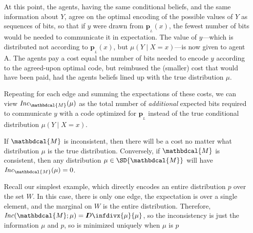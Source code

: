 \documentclass{article}
\theoremstyle{plain}
\theoremstyle{definition}
\theoremstyle{remark}
\newcommand{\thickD}{I\mkern-8muD}
\newcommand{\kldiv}{\thickD\infdivx}
\newcommand\mat[1]{\mathbf{#1}}
\newcommand{\bp}[1][L]{\mat{p}_{\!_{#1}\!}}
\newcommand{\dg}[1]{\mathbdcal{#1}}
\newcommand\Inc{\mathit{Inc}}
\numberwithin{equation}{section}
\begin{document}
\begin{vfull}
At this point, the agents, having the same conditional beliefs, and
the same information about $Y$, agree on the optimal encoding 
of the possible values of $Y$ as sequences of bits, so that if $y$
were drawn from $\bp(x)$, the fewest number of bits would be needed
to communicate it in expectation. The value of $y$---which is distributed
not according to $\bp(x)$, but $\mu(Y \mid X=x)$---is now given to agent A.
The agents pay a cost equal the number of bits needed to encode $y$ according
to the agreed-upon optimal code, but reimbused the (smaller) cost that would have been paid,
had the agents beliefs lined up with the true distribution $\mu$.

Repeating for each edge and summing the expectations of these costs, we can view
$\Inc_{\dg M}(\mu)$ as the total number of \emph{additional} expected
bits required to communicate $y$ with a code optimized for
$\bp$ instead of the true conditional distribution   $\mu(Y \mid X=x)$. 

If $\dg M$ is inconsistent, then there will be a cost no matter what distribution $\mu$ is the true distribution. Conversely, if $\dg M$ is consistent, then any distribution $\mu \in \SD{\dg M}$ will have $\Inc_{\dg M}( \mu) = 0$.  
\begin{example}[continues=ex:worldsonly]
Recall our simplest example, which directly encodes an entire distribution $p$
over the set $W$. In this case, there is only one edge, the expectation is over
a single element, and the marginal on $W$ is the entire distribution. Therefore,
$\Inc(\dg M; \mu) = \kldiv{\mu}{\mu}$, so the inconsistency is just the
information $\mu$ and $p$, so is minimized uniquely when $\mu$ is $p$
\end{example}
%
\end{vfull}
	
\end{document}
